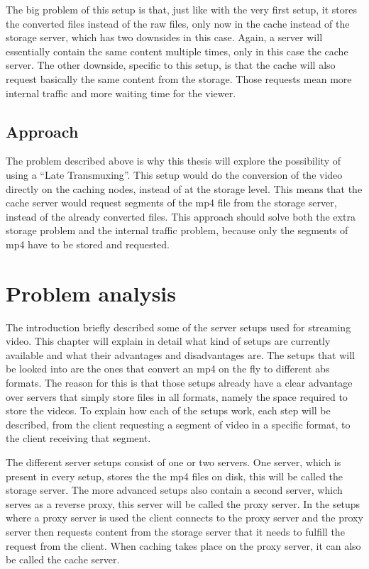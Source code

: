 \documentclass[twoside,openright]{uva-bachelor-thesis}
\begin{document}
The big problem of this setup is that, just like with the very first setup, it
stores the converted files instead of the raw files, only now in the cache
instead of the storage server, which has two downsides in this case. Again, a
server will essentially contain the same content multiple times, only in this
case the cache server. The other downside, specific to this setup, is that the
cache will also request basically the same content from the storage. Those
requests mean more internal traffic and more waiting time for the viewer.

\section{Approach}
The problem described above is why this thesis will explore the possibility of
using a ``Late Transmuxing''. This setup would do the conversion of the video
directly on the caching nodes, instead of at the storage level. This means that
the cache server would request segments of the mp4 file from the storage server,
instead of the already converted files. This approach should solve both the
extra storage problem and the internal traffic problem, because only the segments
of mp4 have to be stored and requested.






\chapter{Problem analysis}
The introduction briefly described some of the server setups used for streaming
video. This chapter will explain in detail what kind of setups are currently
available and what their advantages and disadvantages are. The setups that will
be looked into are the ones that convert an mp4 on the fly to different
\gls{abs} formats. The reason for this is that those setups already have a clear
advantage over servers that simply store files in all formats, namely the space
required to store the videos. To explain how each of the setups work, each step
will be described, from the client requesting a segment of video in a specific
format, to the client receiving that segment.

The different server setups consist of one or two servers. One server, which is
present in every setup, stores the the mp4 files on disk, this will be called
the storage server. The more advanced setups also contain a second server, which
serves as a reverse proxy, this server will be called the proxy server. In the
setups where a proxy server is used the client connects to the proxy server and
the proxy server then requests content from the storage server that it needs
to fulfill the request from the client. When caching takes place on the proxy
server, it can also be called the cache server.
\end{document}
